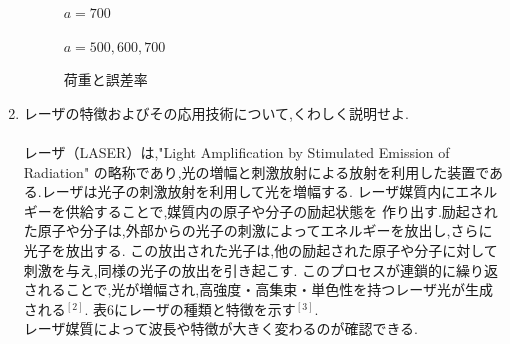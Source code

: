 \documentclass[a4paper,11pt]{jsarticle}
\begin{document}
\begin{enumerate}
\begin{figure}[h]
          \caption{$a = 700$}
        \end{figure}
        \clearpage
        \begin{figure}[h]
          \centering
          \caption{$a = 500,600,700$}
        \end{figure}
        \clearpage
        \begin{figure}[h]
          \centering
          \caption{荷重と誤差率}
        \end{figure}
        \clearpage
  \item レーザの特徴およびその応用技術について,くわしく説明せよ.\\
        \\
        \quad レーザ（LASER）は,"Light Amplification by Stimulated Emission of Radiation"
        の略称であり,光の増幅と刺激放射による放射を利用した装置である.レーザは光子の刺激放射を利用して光を増幅する.
        レーザ媒質内にエネルギーを供給することで,媒質内の原子や分子の励起状態を
        作り出す.励起された原子や分子は,外部からの光子の刺激によってエネルギーを放出し,さらに光子を放出する.
        この放出された光子は,他の励起された原子や分子に対して刺激を与え,同様の光子の放出を引き起こす.
        このプロセスが連鎖的に繰り返されることで,光が増幅され,高強度・高集束・単色性を持つレーザ光が生成される$^{[2]}$.
        表6にレーザの種類と特徴を示す$^{[3]}$.\\レーザ媒質によって波長や特徴が大きく変わるのが確認できる.



\end{enumerate}
\end{document}
